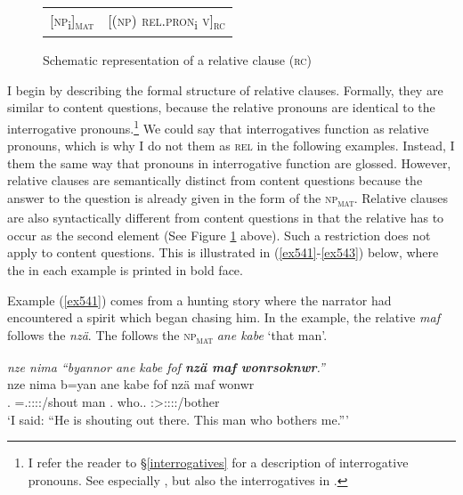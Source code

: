 \begin{figure}[H]
\begin{center}
	\begin{tabularx}{\textwidth}{Xl}
			[\textsc{np}\textsubscript{i}]\textsubscript{\textsc{mat}}& [(\textsc{np}) \textsc{rel.pron}\textsubscript{i} \textsc{v}]\textsubscript{\textsc{rc}}\\
	\end{tabularx}
	\caption{Schematic representation of a relative clause (\textsc{rc})}
	\label{relclause}
\end{center}
\end{figure}%

I begin by describing the formal structure of relative clauses. Formally, they are similar to content questions, because the relative pronouns are identical to the interrogative pronouns.\footnote{I refer the reader to \S{}\ref{interrogatives} for a description of interrogative pronouns. See especially , but also the interrogatives in .} We could say that interrogatives function as relative pronouns, which is why I do not  them as \textsc{rel} in the following examples. Instead, I  them the same way that pronouns in interrogative function are glossed. However, relative clauses are semantically distinct from content questions because the answer to the question is already given in the form of the \textsc{np}\textsubscript{\textsc{mat}}. Relative clauses are also syntactically different from content questions in that the relative  has to occur as the second element (See Figure \ref{relclause} above). Such a restriction does not apply to content questions. This is illustrated in (\ref{ex541}-\ref{ex543}) below, where the  in each example is printed in bold face.%

Example (\ref{ex541}) comes from a hunting story where the narrator had encountered a spirit which began chasing him. In the example, the relative  \emph{maf} follows the  \emph{nzä}. The  follows the \textsc{np}\textsubscript{\textsc{mat}} \emph{ane kabe} `that man'.

\begin{exe}
	\ex \emph{nze nima ``byannor ane kabe fof \textbf{nzä maf wonrsoknwr}.''}\\
	\gll nze nima b=yan ane kabe fof nzä maf wonwr\\
	\Fsg.\Erg{} \Quot{} \Med=\Tsg.\Masc:\Sbj:\Nonpast:\Ipfv:\Venit/shout \Dem{} man \Emph{} \Fsg.\Abs{} who.\Sg.\Erg{} \Stsg:\Sbj>\Fsg:\Obj:\Nonpast:\Ipfv:\Venit/bother\\
	\trans `I said: ``He is shouting out there. This man who bothers me.'''\\
	\label{ex541}
\end{exe}

